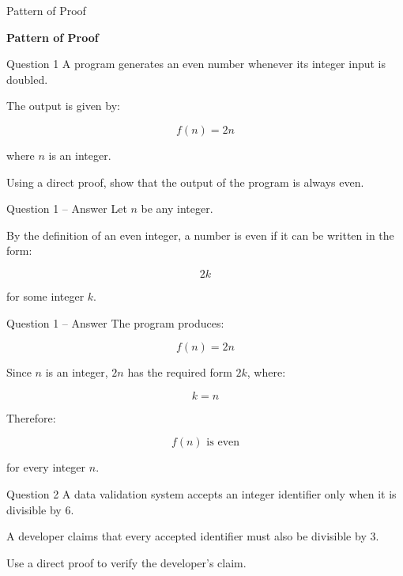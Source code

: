 \begin{frame}{Pattern of Proof}
\begin{center}
\vspace{1.5cm}
{\Huge\textbf{Pattern of Proof}}
\end{center}
\end{frame}


\begin{frame}{Question 1}
A program generates an even number whenever its integer input is doubled.

The output is given by:

$$
f(n)=2n
$$

where $n$ is an integer.

Using a direct proof, show that the output of the program is always even.
\end{frame}

\begin{frame}{Question 1 -- Answer}
Let $n$ be any integer.

By the definition of an even integer, a number is even if it can be written
in the form:

$$
2k
$$

for some integer $k$.
\end{frame}

\begin{frame}{Question 1 -- Answer}
The program produces:

$$
f(n)=2n
$$

Since $n$ is an integer, $2n$ has the required form $2k$, where:

$$
k=n
$$

Therefore:

$$
\boxed{f(n)\text{ is even}}
$$

for every integer $n$.
\end{frame}


\begin{frame}{Question 2}
A data validation system accepts an integer identifier only when it is
divisible by $6$.

A developer claims that every accepted identifier must also be divisible
by $3$.

Use a direct proof to verify the developer's claim.
\end{frame}

